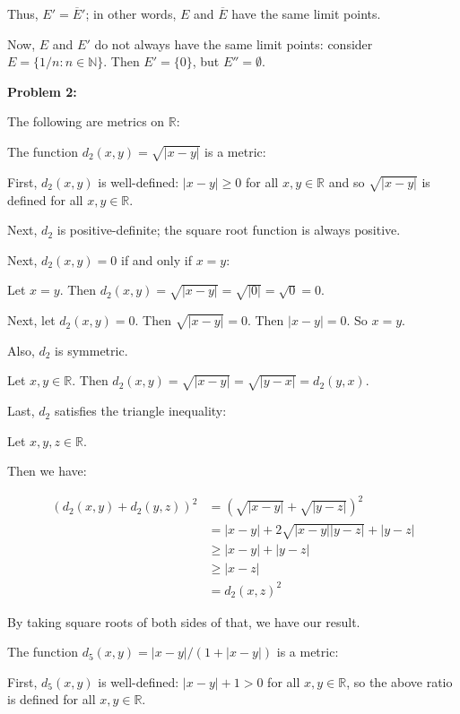 \documentclass[a4paper,12pt]{article}
\newcommand{\tab}{\hspace{4mm}} %
\newcommand{\shunt}{\vspace{20mm}}
\newcommand{\absval}[1]{\lvert #1 \rvert}
\newcommand{\N}{\mathbb{N}}
\newcommand{\R}{\mathbb{R}}
\begin{document}
Thus, $E' = \overline{E}'$; in other words, $E$ and $\overline{E}$ have the same limit points.

Now, $E$ and $E'$ do not always have the same limit points: consider $E = \{1/n: n \in \N\}$. Then $E' = \{0\}$, but $E'' = \emptyset$.

\shunt

{\bf Problem 2:}

The following are metrics on $\R$:

The function $d_2(x,y) = \sqrt{\absval{x-y}}$ is a metric:

\tab First, $d_2(x,y)$ is well-defined: $\absval{x-y} \geq 0$ for all $x, y \in \R$ and so $\sqrt{\absval{x-y}}$ is defined for all $x,y \in \R$.

\tab Next, $d_2$ is positive-definite; the square root function is always positive.

\tab Next, $d_2(x,y) = 0$ if and only if $x=y$: 

\tab \tab Let $x=y$. Then $d_2(x,y) = \sqrt{\absval{x-y}}=\sqrt{\absval{0}}=\sqrt{0}=0$.

\tab \tab Next, let $d_2(x,y) = 0$. Then $\sqrt{\absval{x-y}}=0$. Then $\absval{x-y}=0$. So $x=y$.

\tab Also, $d_2$ is symmetric.

\tab \tab Let $x,y \in \R$. Then $d_2(x,y) = \sqrt{\absval{x-y}} = \sqrt{\absval{y-x}}=d_2(y,x)$.

\tab Last, $d_2$ satisfies the triangle inequality:

\tab \tab Let $x,y,z \in \R$.

\tab \tab Then we have:

\begin{align*}
(d_2(x,y) +d_2(y,z))^2 &= (\sqrt{\absval{x-y}} + \sqrt{\absval{y-z}})^2 \\
&= \absval{x-y} + 2 \sqrt{\absval{x-y}\absval{y-z}} + \absval{y-z}\\
&\geq \absval{x-y} + \absval{y-z}\\
&\geq \absval{x-z}\\
&=d_2(x,z)^2
\end{align*} 

\tab \tab By taking square roots of both sides of that, we have our result.

The function $d_5(x,y) = \absval{x-y}/(1+\absval{x-y})$ is a metric:

\tab First, $d_5(x,y)$ is well-defined: $\absval{x-y} +1 > 0$ for all $x,y \in \R$, so the above ratio is defined for all $x,y \in \R$.
\end{document}
